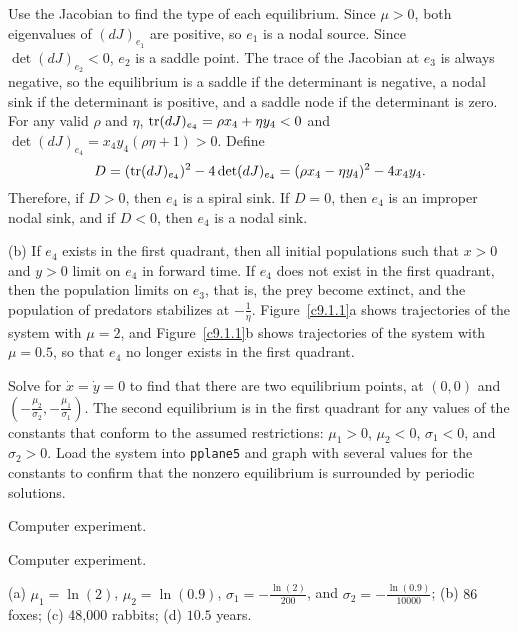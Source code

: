 \documentclass{ximera}
\begin{document}
Use the Jacobian to find the type of each equilibrium.  Since $\mu > 0$,
both eigenvalues of $(dJ)_{e_1}$ are positive, so $e_1$ is a nodal source. 
Since $\det(dJ)_{e_2} < 0$, $e_2$ is a saddle point.  The trace of the
Jacobian at $e_3$ is always negative, so the equilibrium is a saddle if the
determinant is negative, a nodal sink if the determinant is positive, and
a saddle node if the determinant is zero.
For any valid $\rho$ and $\eta$, ${\rm tr}(dJ)_{e_4} = \rho x_4 +
\eta y_4 < 0$ and $\det(dJ)_{e_4} = x_4y_4(\rho\eta + 1) > 0$.
Define
\[
D = ({\rm tr}(dJ)_{e_4})^2 - 4\det(dJ)_{e_4} =
(\rho x_4 - \eta y_4)^2 - 4x_4y_4.
\]
Therefore, if $D > 0$, then $e_4$ is a spiral sink.  If $D = 0$, then
$e_4$ is an improper nodal sink, and if $D < 0$, then $e_4$ is a nodal
sink.

(b) If $e_4$ exists in the first quadrant, then all initial
populations such that $x > 0$ and $y > 0$ limit on $e_4$ in forward time. 
If $e_4$ does not exist in the first quadrant, then the population limits on
$e_3$, that is, the prey become extinct, and the population of predators
stabilizes at $-\frac{1}{\eta}$.  Figure~\ref{c9.1.1}a shows trajectories
of the system with $\mu = 2$, and Figure~\ref{c9.1.1}b shows trajectories
of the system with $\mu = 0.5$, so that $e_4$ no longer exists in the first
quadrant.

\begin{figure}[htb]
                       \centerline{%
                       }
\end{figure}

Solve  for $\dot{x} = \dot{y} = 0$ to find that there are
two equilibrium points, at $(0,0)$ and $(-\frac{\mu_2}{\sigma_2},
-\frac{\mu_1}{\sigma_1})$.  The second equilibrium is in the first
quadrant for any values of the constants that conform to the assumed
restrictions: $\mu_1 > 0$, $\mu_2 < 0$, $\sigma_1 < 0$, and
$\sigma_2 > 0$.  Load the system into {\tt pplane5} and graph with
several values for the constants to confirm that the nonzero
equilibrium is surrounded by periodic solutions.

  Computer experiment.

  Computer experiment.

\newpage
{}
\ans (a) $\mu_1=\ln(2)$, $\mu_2=\ln(0.9)$, $\sigma_1 = -\frac{\ln(2)}{200}$,
and $\sigma_2 = -\frac{\ln(0.9)}{10000}$; (b) $86$ foxes; (c) 48,000 rabbits; 
(d) $10.5$ years.
\end{document}
